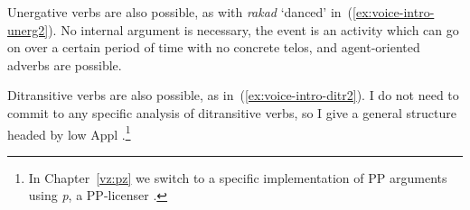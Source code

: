 \begin{exe}
\begin{xlist}
\begin{exe}
\begin{xlist}
\begin{exe}
\begin{xlist}
\begin{exe}
\begin{exe}
\begin{xlist}
\begin{exe}
\begin{xlist}
\begin{exe}
\begin{xlist}
\begin{exe}
\begin{xlist}
\begin{exe}
\begin{xlist}
\begin{exe}
\begin{xlist}
\begin{exe}
\begin{xlist}
\begin{exe}
\begin{xlist}
\begin{exe}
\begin{xlist}
\begin{exe}
\begin{xlist}
\begin{exe}
\begin{xlist}
\begin{exe}
\begin{xlist}
\begin{exe}
\begin{exe}
\begin{xlist}
Unergative verbs are also possible, as with \emph{rakad} `danced' in~(\ref{ex:voice-intro-unerg2}). No internal argument is necessary, the event is an activity which can go on over a certain period of time with no concrete telos, and agent-oriented adverbs are possible.
 \begin{exe}
 \ex \label{ex:voice-intro-unerg2} 
 \begin{xlist} 
	
 	 \z
\z 

Ditransitive verbs are also possible, as in~(\ref{ex:voice-intro-ditr2}). I do not need to commit to any specific analysis of ditransitive verbs, so I give a general structure headed by low Appl \citep[18]{pylkkanen08}.\footnote{In Chapter~\ref{vz:pz} we switch to a specific implementation of PP arguments using \emph{p}, a PP-licenser \citep{koopman97,svenonius03,gehrke08phd,wood15springer}.}
 \begin{exe}
 \ex \label{ex:voice-intro-ditr2} 
 \begin{xlist} 
	
 	 \z
\z 


\end{xlist}
\end{exe}
\end{xlist}
\end{exe}
\end{xlist}
\end{exe}
\end{exe}
\end{xlist}
\end{exe}
\end{xlist}
\end{exe}
\end{xlist}
\end{exe}
\end{xlist}
\end{exe}
\end{xlist}
\end{exe}
\end{xlist}
\end{exe}
\end{xlist}
\end{exe}
\end{xlist}
\end{exe}
\end{xlist}
\end{exe}
\end{xlist}
\end{exe}
\end{xlist}
\end{exe}
\end{xlist}
\end{exe}
\end{exe}
\end{xlist}
\end{exe}
\end{xlist}
\end{exe}
\end{xlist}
\end{exe}
